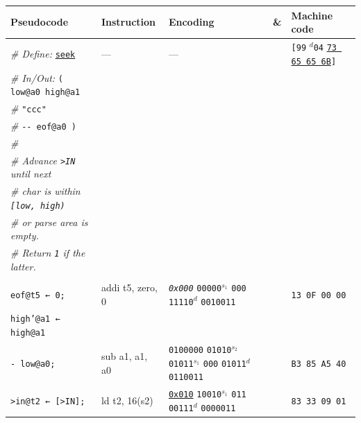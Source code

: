\documentclass[a4paper,12pt,final]{article}
\begin{document}
\begin{table}[!htbp] \begin{adjustwidth}{-1cm}{-1cm} \fontsize{8}{9.600000}\selectfont
\begin{center}
\begin{tabular}{l|ll|l|l}
\textbf{Pseudocode} & \textbf{Instruction} & \textbf{Encoding} & \textbf{\&} & \textbf{Machine code}\\[0pt]
\hline
\emph{\# Define:} \uline{\texttt{seek}} & --- & --- &  & \texttt{[99} \(^{d}\)​\texttt{04} \uline{\texttt{73 65 65 6B}}​\texttt{]}\\[0pt]
\emph{\# In/Out:}    \texttt{( low@a0 high@a1} &  &  &  & \\[0pt]
\emph{\#}\hspace{4.9em}      \texttt{"ccc"} &  &  &  & \\[0pt]
\emph{\#}\hspace{3.35em} \texttt{-​- eof@a0 )} &  &  &  & \\[0pt]
\emph{\#} &  &  &  & \\[0pt]
\emph{\# Advance \texttt{>IN} until next} &  &  &  & \\[0pt]
\emph{\# char is within \texttt{[low, high)}} &  &  &  & \\[0pt]
\emph{\# or parse area is empty.} &  &  &  & \\[0pt]
\emph{\# Return \texttt{1} if the latter.} &  &  &  & \\[0pt]
 &  &  &  & \\[0pt]
\hspace{1.053000em} \texttt{eof@t5 ← 0;} & addi t5, zero, 0 & \emph{\texttt{0x000}}                    \texttt{00000}​\(^{s_{1}}\) \texttt{000} \texttt{11110}​\(^{d}\)  \texttt{0010011} &  & \texttt{13 0F 00 00}\\[0pt]
\hspace{1.053000em} \texttt{high'@a1 ← high@a1} &  &  &  & \\[0pt]
\hspace{5.791500em}         \texttt{- low@a0;} & sub a1, a1, a0 & \texttt{0100000} \texttt{01010}​\(^{s_{2}}\) \texttt{01011}​\(^{s_{1}}\) \texttt{000} \texttt{01011}​\(^{d}\)  \texttt{0110011} &  & \texttt{B3 85 A5 40}\\[0pt]
\hspace{1.053000em} \texttt{>in@t2 ← [>IN];} & ld t2, 16(s2) & \uline{\texttt{0x010}}                    \texttt{10010}​\(^{s_{1}}\) \texttt{011} \texttt{00111}​\(^{d}\)  \texttt{0000011} &  & \texttt{83 33 09 01}\\[0pt]

\end{tabular}
\end{center}
\end{adjustwidth}
\end{table}
\end{document}
